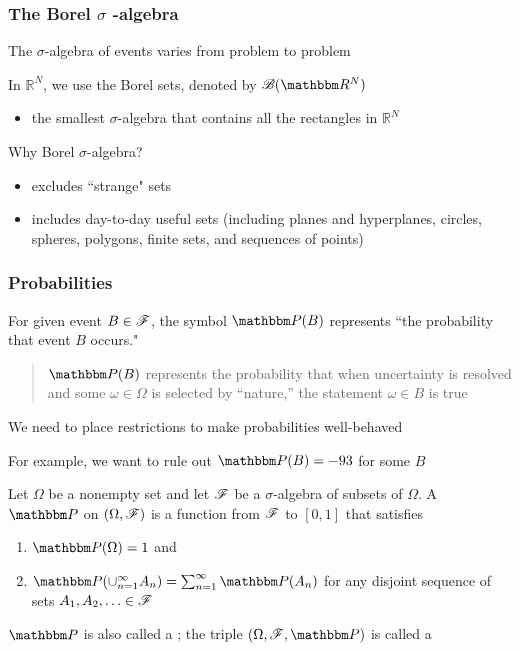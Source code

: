 \begin{frame}\frametitle{The Borel $\sigma$ -algebra}
    
    \vspace{2em}
    The $\sigma$-algebra of events varies from problem to problem
    
    In $\mathbb{R}^{N}$, we use the Borel sets, denoted by $\bB(\RR^N)$ 
    \begin{itemize}
        \item the smallest $\sigma$-algebra that contains all the rectangles in $\mathbb{R}^{N}$ 
    \end{itemize}
    
    Why  Borel $\sigma$-algebra?
    \begin{itemize}
        \item excludes ``strange" sets 
        \item includes day-to-day useful sets (including planes and
        hyperplanes, circles, spheres, polygons, finite sets, and sequences of points)
    \end{itemize}
    
\end{frame}

\begin{frame}\frametitle{Probabilities}

    \vspace{2em}
    For given event $B\in \mathscr F$, the symbol
    $\PP(B)$ represents ``the probability that event $B$
    occurs."
    \begin{quote}
        $\PP(B)$ represents the probability that
        when uncertainty is resolved and some $\omega \in \Omega$ is selected by
        ``nature,'' the statement $\omega \in B$ is true
    \end{quote}
    
\end{frame}

\begin{frame}

    \vspace{2em}
    We need to place restrictions to make probabilities well-behaved
    
    For example, we want to rule out $\PP(B) = -93$ for some $B$
    
    \vspace{1em}
    Let $\Omega$ be a nonempty set and let $\mathscr F$ be a $\sigma$-algebra 
    of subsets of $\Omega$.  A  $\PP$ on $(\Omega, \mathscr F)$
    is a function from $\mathscr F$ to $[0,1]$ that satisfies
    \begin{enumerate}
        \label{enum:prob}
      \item $\PP(\Omega) = 1$ and
      \item $\PP(\cup_{n=1}^{\infty} A_n) = \sum_{n=1}^{\infty} \PP(A_n)$ for any
          disjoint sequence of sets $A_1, A_2, \ldots \in \mathscr F$
    \end{enumerate}
     
     $\PP$ is also called a ; 
     the triple $(\Omega, \fF, \PP)$ is called a 
    
\end{frame}

